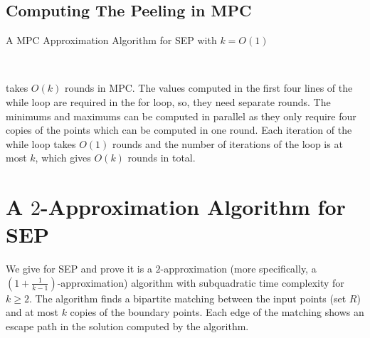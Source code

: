 \documentclass[preprint,12pt]{elsarticle}
\newcommand{\size}[1]{\lvert #1 \rvert}
\begin{document}
\subsection{Computing The Peeling in MPC}

%
\begin{algorithm}[h]
\caption{A MPC Approximation Algorithm for SEP with $k=O(1)$}
\label{alg:grid}
\begin{algorithmic}[1]
\While{$\size{T}\neq \emptyset$}
\EndIf
\EndFor
{}
\EndWhile
\\ 
\end{algorithmic}
\end{algorithm}

 takes $O(k)$ rounds in MPC. The values computed in the first four lines of the while loop are required in the for loop, so, they need separate rounds. The minimums and maximums can be computed in parallel as they only require four copies of the points which can be computed in one round. Each iteration of the while loop takes $O(1)$ rounds and the number of iterations of the loop is at most $k$, which gives $O(k)$ rounds in total.


%
\section{A $2$-Approximation Algorithm for SEP}\label{sec:disjoint}
We give  for SEP and prove it is a $2$-approximation (more specifically, a $(1+\frac{1}{k-1})$-approximation) algorithm with subquadratic time complexity for $k\geq 2$.
The algorithm finds a bipartite matching between the input points (set $R$) and at most $k$ copies of the boundary points. Each edge of the matching shows an escape path in the solution computed by the algorithm.
\end{document}
